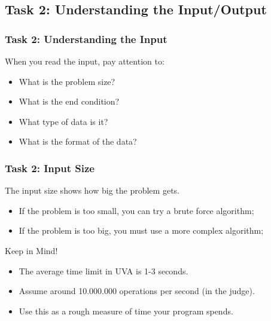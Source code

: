 \documentclass{beamer}
\begin{document}
\subsection{Task 2: Understanding the Input/Output}

\begin{frame}
  \frametitle{Task 2: Understanding the Input}

  When you read the input, pay attention to:
  
  \bigskip

  {\small
  \begin{itemize}
  \item What is the problem size?
  \item What is the end condition?
  \item What type of data is it?
  \item What is the format of the data?
  \end{itemize}
  }
\end{frame}

\begin{frame}
  \frametitle{Task 2: Input Size}

  The input size shows how big the problem gets.

  \begin{itemize}
  \item If the problem is too small, you can try a brute force
    algorithm;
  \item If the problem is too big, you must use a more complex
    algorithm;
  \end{itemize}
  
  \begin{block}{Keep in Mind!}
    \begin{itemize}
    \item The average time limit in UVA is 1-3 seconds.
    \item Assume around 10.000.000 operations per second (in the judge).
    \item Use this as a \alert{rough measure} of time your program spends.
    \end{itemize}
  \end{block}
\end{frame}
\end{document}
